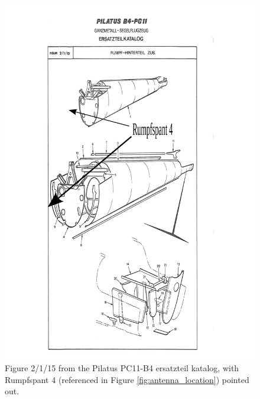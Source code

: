 \documentclass{article}
\begin{document}
\begin{figure}
\includegraphics[width=\textwidth,keepaspectratio]{b4_ersatzteil_katalog_fig_2_1_15_annotated}
\caption{Figure 2/1/15 from the Pilatus PC11-B4 ersatzteil katalog, with Rumpfspant 4 (referenced in Figure \ref{fig:antenna_location}) pointed out.}
\label{fig:ersatzteil_rumpfspant4}
\end{figure}
\end{document}
